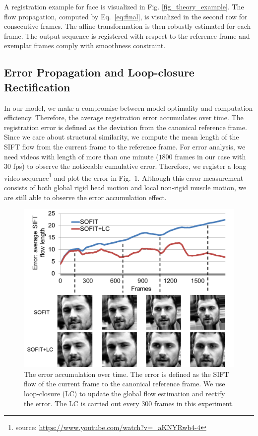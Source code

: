 \documentclass[review]{elsarticle}
\begin{document}
A registration example for face is visualized in Fig. \ref{fig_theory_example}. The flow propagation, computed by Eq.~\eqref{eq:final}, is visualized in the second row for consecutive frames. The affine transformation is then robustly estimated for each frame. The output sequence is registered with respect to the reference frame and exemplar frames comply with smoothness constraint. 


\subsection{\label{sec:details}Error Propagation and Loop-closure Rectification}

In our model, we make a compromise between model optimality and computation efficiency. Therefore, the average registration error accumulates over time. The registration error is defined as the deviation from the canonical reference frame. Since we care about structural similarity, we compute the mean length of the SIFT flow from the current frame to the reference frame. For error analysis, we need videos with length of more than one minute ($1800$ frames in our case with $30$ fps) to observe the noticeable cumulative error. Therefore, we register a long video sequence\footnote{source: \url{https://www.youtube.com/watch?v=_aKNYRwb4-4}} and plot the error in Fig.~\ref{fig_error_prop}. Although this error measurement consists of both global rigid head motion and local non-rigid muscle motion, we are still able to observe the error accumulation effect.

\begin{figure}[htbp]
	\centering
	\includegraphics[width=.9\columnwidth]{fig/error_prop.png}
	\caption{The error accumulation over time. The error is defined as the SIFT flow of the current frame to the canonical reference frame. We use loop-closure (LC) to update the global flow estimation and rectify the error. The LC is carried out every $300$ frames in this experiment.}
	\label{fig_error_prop}
\end{figure}
\end{document}
